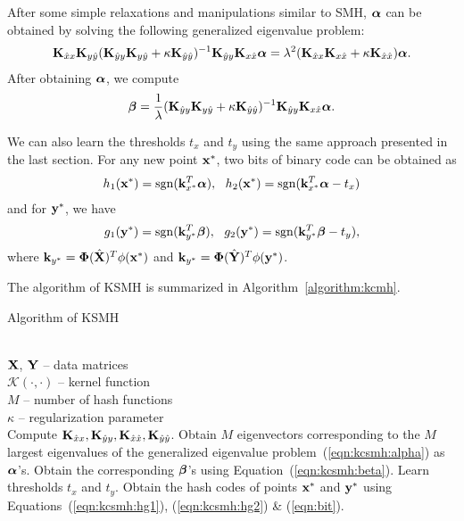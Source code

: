 After some simple relaxations and manipulations similar to \mbox{SMH}, $\mbox{\boldmath$\alpha$\unboldmath}$ can be obtained by solving the following generalized eigenvalue problem:
\begin{align}
\label{eqn:kcsmh:alpha}
{\bf K}_{\hat{x}x}{\bf K}_{y\hat{y}}({\bf K}_{\hat{y}y}{\bf K}_{y\hat{y}} + \kappa{\bf K}_{\hat{y}\hat{y}})^{-1}{\bf K}_{\hat{y}y}{\bf K}_{x\hat{x}}\mbox{\boldmath$\alpha$\unboldmath} =\lambda^2({\bf K}_{\hat{x}x}{\bf K}_{x\hat{x}} + \kappa{\bf K}_{\hat{x}\hat{x}})\mbox{\boldmath$\alpha$\unboldmath}.
\end{align}
After obtaining $\mbox{\boldmath$\alpha$\unboldmath}$, we compute
\begin{align}
\label{eqn:kcsmh:beta}
\mbox{\boldmath$\beta$\unboldmath} =\frac{1}{\lambda} ({\bf K}_{\hat{y}y}{\bf K}_{y\hat{y}}+\kappa{\bf K}_{\hat{y}\hat{y}})^{-1}{\bf K}_{\hat{y}y}{\bf K}_{x\hat{x}}\mbox{\boldmath$\alpha$\unboldmath}.
\end{align}

We can also learn the thresholds $ t_x $ and $ t_y $ using the same approach presented in the last section.  For any new point ${\bf x}^{*}$, two bits of binary code can be obtained as
\begin{align}
\label{eqn:kcsmh:hg1}
h_1({\bf x}^{*}) = \mathop{\rm sgn}({\bf k}_{x^{*}}^{T}\mbox{\boldmath$\alpha$\unboldmath}), \ \ h_2({\bf x}^{*}) = \mathop{\rm sgn}({\bf k}_{x^{*}}^{T}\mbox{\boldmath$\alpha$\unboldmath}-t_x)
\end{align}
and for $ {\bf y}^{*} $, we have
\begin{align}
\label{eqn:kcsmh:hg2}
g_1({\bf y}^{*}) = \mathop{\rm sgn}({\bf k}_{y^{*}}^{T}\mbox{\boldmath$\beta$\unboldmath}), \ \ g_2({\bf y}^{*}) = \mathop{\rm sgn}({\bf k}_{y^{*}}^{T}\mbox{\boldmath$\beta$\unboldmath}-t_y),
\end{align}
where ${\bf k}_{y^{*}} = \mbox{\boldmath$\Phi$\unboldmath}(\hat{{\bf X}})^{T}\phi({\bf x}^{*})$ and ${\bf k}_{y^{*}} = \mbox{\boldmath$\Phi$\unboldmath}(\hat{{\bf Y}})^{T}\phi({\bf y}^{*})$.

The algorithm of \mbox{KSMH} is summarized in Algorithm~\ref{algorithm:kcmh}.

\begin{algorithm}[ht]
\caption{Algorithm of \mbox{KSMH}}
\label{algorithm:kcmh}
\begin{algorithmic}
 \\
${\bf X}$, ${\bf Y}$ -- data matrices
\\$\mathcal{K}(\cdot,\cdot)$ -- kernel function
\\ $M$ -- number of hash functions
\\ $\kappa$ -- regularization parameter
 \\

   \STATE Compute ${\bf K}_{\hat{x}x}, {\bf K}_{\hat{y}y}, {\bf K}_{\hat{x}\hat{x}}, {\bf K}_{\hat{y}\hat{y}}$.
   \STATE Obtain $M$ eigenvectors corresponding to the $M$ largest eigenvalues of the generalized \STATE eigenvalue problem~(\ref{eqn:kcsmh:alpha}) as $\mbox{\boldmath$\alpha$\unboldmath}$'s.
   \STATE Obtain the corresponding $\mbox{\boldmath$\beta$\unboldmath}$'s using Equation~(\ref{eqn:kcsmh:beta}).
   \STATE Learn thresholds $ t_x $ and $ t_y $.
   \STATE Obtain the hash codes of points ${\bf x}^{*}$ and ${\bf y}^{*}$ using Equations~(\ref{eqn:kcsmh:hg1}), (\ref{eqn:kcsmh:hg2}) \& (\ref{eqn:bit}).

\end{algorithmic}

\end{algorithm}


